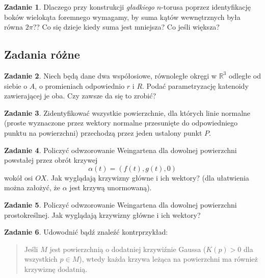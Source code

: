 \documentclass[a4paper,11pt]{article}
\theoremstyle{definition}\newtheorem{exercise}{Zadanie}
\theoremstyle{definition}\newtheorem{remark}{Uwaga}
\begin{document}
\begin{exercise}
Dlaczego przy konstrukcji \textit{gładkiego} $n$\nobreakdash-torusa poprzez 
identyfikację bok\'ow wielokąta foremnego wymagamy, by suma kąt\'ow 
wewnętrznych była r\'owna $2\pi$?? Co się dzieje kiedy suma jest mniejsza? Co 
jeśli większa?
\end{exercise}



\subsection{Zadania r\'ożne}
\begin{exercise}
Niech będą dane dwa współosiowe, równoległe okręgi w $\mathbb{R}^3$ odległe od siebie o $A$, o promieniach odpowiednio $r$ i $R$. Podać parametryzację katenoidy zawierającej je oba. Czy zawsze da się to zrobić?
\end{exercise}


\begin{exercise}
Zidentyfikować wszystkie powierzchnie, dla których linie normalne (proste 
wyznaczone przez wektory normalne przesunięte do odpowiedniego punktu na 
powierzchni) przechodzą przez jeden ustalony punkt $P$.
\end{exercise}

\begin{exercise}
Policzyć odwzorowanie Weingartena dla dowolnej powierzchni powstałej przez obrót krzywej \[\alpha(t)=(f(t),g(t),0)\] wokół osi $OX$. Jak wyglądają krzywizny główne i ich wektory? (dla ułatwienia można założyć, że $\alpha$ jest krzywą unormowaną).
\end{exercise}

\begin{exercise}
Policzyć odwzorowanie Weingartena dla dowolnej powierzchni prostokreślnej. Jak wyglądają krzywizny główne i ich wektory?
\end{exercise}


\begin{exercise}
Udowodnić bądź znaleźć kontrprzykład:
\begin{quote}
Jeśli $M$ jest powierzchnią o dodatniej krzywiźnie Gaussa ($K(p)>0$ dla 
wszystkich $p\in M$), wtedy każda krzywa leżąca na powierzchni ma również 
krzywiznę dodatnią.
\end{quote}

\end{exercise}
\end{document}
